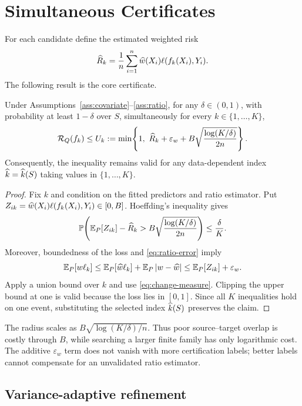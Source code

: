 \section{Simultaneous Certificates}
\label{sec:method}

For each candidate define the estimated weighted risk
\begin{equation}
  \widehat R_k=\frac{1}{n}\sum_{i=1}^{n}
  \widehat w(X_i)\ell(f_k(X_i),Y_i).
  \label{eq:empirical-risk}
\end{equation}
The following result is the core certificate.

\begin{theorem}
\label{thm:certificate}
Under Assumptions~\ref{ass:covariate}--\ref{ass:ratio}, for any
$\delta\in(0,1)$, with probability at least $1-\delta$ over $S$, simultaneously
for every $k\in\{1,\ldots,K\}$,
\begin{equation}
  \mathcal{R}_Q(f_k)\leq U_k
  :=\min\!\left\{1,\ \widehat R_k+\varepsilon_w
       +B\sqrt{\frac{\log(K/\delta)}{2n}}\right\}.
  \label{eq:certificate}
\end{equation}
Consequently, the inequality remains valid for any data-dependent index
$\widehat k=\widehat k(S)$ taking values in $\{1,\ldots,K\}$.
\end{theorem}

\begin{proof}
Fix $k$ and condition on the fitted predictors and ratio estimator.  Put
$Z_{ik}=\widehat w(X_i)\ell(f_k(X_i),Y_i)\in[0,B]$.  Hoeffding's inequality gives
\[
  \mathbb{P}\!\left(\mathbb{E}_P[Z_{ik}]-\widehat R_k>B
  \sqrt{\frac{\log(K/\delta)}{2n}}\right)\leq\frac{\delta}{K}.
\]
Moreover, boundedness of the loss and \cref{eq:ratio-error} imply
\[
  \mathbb{E}_P[w\ell_k]
  \leq \mathbb{E}_P[\widehat w\ell_k]+\mathbb{E}_P\left\lvert w-\widehat w\right\rvert
  \leq \mathbb{E}_P[Z_{ik}]+\varepsilon_w.
\]
Apply a union bound over $k$ and use \cref{eq:change-measure}.  Clipping the upper
bound at one is valid because the loss lies in $[0,1]$.  Since all $K$ inequalities
hold on one event, substituting the selected index $\widehat k(S)$ preserves the claim.
\end{proof}

The radius scales as $B\sqrt{\log(K/\delta)/n}$.  Thus poor source--target overlap
is costly through $B$, while searching a larger finite family has only logarithmic
cost.  The additive $\varepsilon_w$ term does not vanish with more certification
labels; better labels cannot compensate for an unvalidated ratio estimator.

\subsection{Variance-adaptive refinement}

